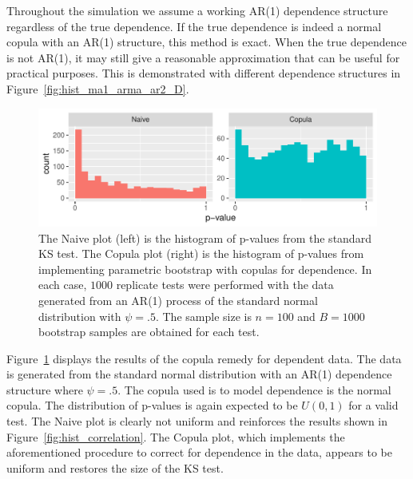 \documentclass[12pt, letterpaper, titlepage]{article}
\begin{document}
Throughout the simulation we assume a working AR(1) dependence structure
regardless of the true dependence. If the true dependence is indeed a normal
copula with an AR(1) structure, this method is exact. When the true dependence
is not AR(1), it may still give a reasonable approximation that can be useful
for practical purposes. This is demonstrated with different dependence
structures in Figure~\ref{fig:hist_ma1_arma_ar2_D}.

\begin{figure}[tbp]
  \centering
  \includegraphics[width=\textwidth]{hist_ar1_D}
  \caption{The Naive plot (left) is the histogram of p-values from the
  standard KS test. The Copula plot (right) is the histogram of p-values from
  implementing parametric bootstrap with copulas for dependence. In each case,
  $1000$ replicate tests were performed with the data generated from an AR(1)
  process of the standard normal distribution with $\psi = .5$. The sample size
  is $n = 100$ and $B = 1000$ bootstrap samples are obtained for each test.}
  \label{fig:hist_ar1_D}
\end{figure}

Figure~\ref{fig:hist_ar1_D} displays the results of the copula remedy for
dependent data. The data is generated from the standard normal distribution with
an AR(1) dependence structure where $\psi = .5$. The copula used is to model
dependence is the normal copula. The distribution of p-values is again expected
to be $U(0, 1)$ for a valid test. The Naive plot is clearly not uniform and
reinforces the results shown in Figure~\ref{fig:hist_correlation}. The Copula
plot, which implements the aforementioned procedure to correct for dependence
in the data, appears to be uniform and restores the size of the KS test.
\end{document}
